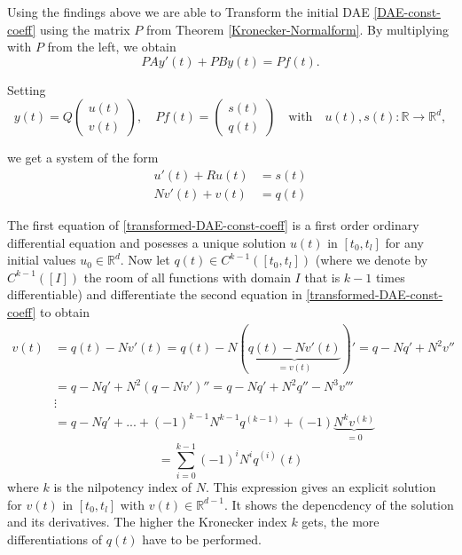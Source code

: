 


Using the findings above we are able to Transform the initial DAE \eqref{DAE-const-coeff} using the matrix $P$ from Theorem \ref{Kronecker-Normalform}. By multiplying with $P$ from the left, we obtain
\begin{displaymath}
	P A y'(t) + P B y(t) = P f(t) .
\end{displaymath}

Setting
\begin{displaymath}
	y(t) = Q
	\left(
	\begin{matrix}
		u(t) \\
		v(t)
	\end{matrix}  
	\right) 
	, \quad
	Pf(t) = 
	\left(
	\begin{matrix}
		s(t) \\
		q(t)
	\end{matrix}
	\right)
	\quad \text{with} \quad
	u(t),s(t) : \mathbb{R} \to \mathbb{R}^d ,
\end{displaymath}

we get a system of the form
\begin{equation}
	\label{transformed-DAE-const-coeff}
	\begin{aligned}
		u'(t) + Ru(t) &= s(t) \\
		Nv'(t) + v(t) &= q(t)
	\end{aligned}
\end{equation}

The first equation of \eqref{transformed-DAE-const-coeff} is a first order ordinary differential equation and posesses a unique solution $u(t)$ in $[t_0,t_l]$ for any initial values $u_0 \in \mathbb{R}^d$. Now let $q(t) \in C^{k-1}([t_0,t_l])$ (where we denote by $C^{k-1}([I])$ the room of all functions with domain $I$ that is $k-1$ times differentiable) and differentiate the second equation in \ref{transformed-DAE-const-coeff} to obtain
\begin{displaymath}
	\begin{aligned}
		v(t) &= q(t) - Nv'(t) = q(t) - N(\underbrace{q(t)-Nv'(t)}_{=v(t)})' = q-Nq'+N^2v'' \\
		&= q-Nq'+N^2(q-Nv')'' = q-Nq'+N^2q''-N^3v''' \\
		&\vdots \\
		&= q-Nq'+...+(-1)^{k-1}N^{k-1}q^{(k-1)}+(-1) \underbrace{N^kv^{(k)}}_{=0}
	\end{aligned}
\end{displaymath}
\begin{equation}
	\label{solution-to-transformed-DAE-const-coeff-part2}
	= \sum_{i=0}^{k-1} (-1)^iN^iq^{(i)}(t) 
\end{equation}
where $k$ is the nilpotency index of $N$. This expression gives an explicit solution for $v(t)$ in $[t_0,t_l]$ with $v(t) \in \mathbb{R}^{d-1}$. It shows the depencdency of the solution and its derivatives. The higher the Kronecker index $k$ gets, the more differentiations of $q(t)$ have to be performed.

